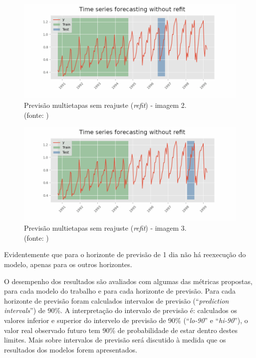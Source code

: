 \begin{figure}[!h]
	\centering
	\includegraphics[scale=0.3]{Figuras/imagem2_skforecast-backtesting-no-refit.png}
	\caption{Previsão multietapas sem reajuste (\textit{refit}) - imagem 2.\\(fonte: \cite{skforecast})}
	\label{fig:imagem2_skforecast-backtesting-no-refit}
\end{figure}

\begin{figure}[!h]
	\centering
	\includegraphics[scale=0.3]{Figuras/imagem3_skforecast-backtesting-no-refit.png}
	\caption{Previsão multietapas sem reajuste (\textit{refit}) - imagem 3.\\(fonte: \cite{skforecast})}
	\label{fig:imagem3_skforecast-backtesting-no-refit}
\end{figure}

Evidentemente que para o horizonte de previsão de 1 dia não há reexecução do modelo, apenas para os outros horizontes.

O desempenho dos resultados são avaliados com algumas das métricas propostas, para cada modelo do trabalho e para cada horizonte de previsão. Para cada horizonte de previsão foram calculados intervalos de previsão (``\textit{prediction intervals}'') de 90\%. A interpretação do intervalo de previsão é: calculados os valores inferior e superior do intervelo de previsão de 90\% (``\textit{lo-90}'' e ``\textit{hi-90}''), o valor real observado futuro tem 90\% de probabilidade de estar dentro destes limites.\cite{hyndman_fpp3_2024a} Mais sobre intervalos de previsão será discutido à medida que os resultados dos modelos forem apresentados.

